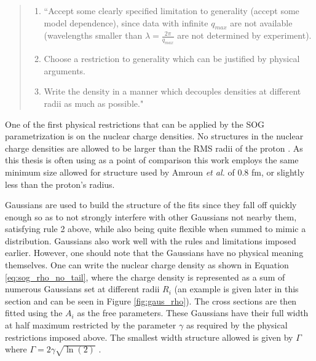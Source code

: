 \begin{quote}
	\begin{enumerate}
		\item ``Accept some clearly specified limitation to generality (accept some model dependence), since data with infinite $q_{max}$ are not available (wavelengths smaller than $\lambda = \frac{2\pi}{q_{max}}$ are not determined by experiment).
		\item Choose a restriction to generality which can be justified by physical arguments.
		\item Write the density in a manner which decouples densities at different radii as much as possible." \cite{Article:SOG}
	\end{enumerate}
\end{quote} 

One of the first physical restrictions that can be applied by the SOG parametrization is on the nuclear charge densities. No structures in the nuclear charge densities are allowed to be larger than the RMS radii of the proton \cite{Article:SOG}. As this thesis is often using \cite{Article:Amroun} as a point of comparison this work employs the same minimum size allowed for structure used by Amroun \textit{et al.} \cite{Article:Amroun} of 0.8 fm, or slightly less than the proton's radius. 


Gaussians are used to build the structure of the fits since they fall off quickly enough so as to not strongly interfere with other Gaussians not nearby them, satisfying rule 2 above, while also being quite flexible when summed to mimic a distribution. Gaussians also work well with the rules and limitations imposed earlier. However, one should note that the Gaussians have no physical meaning themselves. One can write the nuclear charge density as shown in Equation \ref{eq:sog_rho_no_tail}, where the charge density is represented as a sum of numerous Gaussians set at different radii $R_i$ (an example is given later in this section and can be seen in Figure \ref{fig:gaus_rho}). The cross sections are then fitted using the $A_i$ as the free parameters. These Gaussians have their full width at half maximum restricted by the parameter $\gamma$ as required by the physical restrictions imposed above. The smallest width structure allowed is given by $\Gamma$ where $\Gamma = 2\gamma \sqrt{\ln(2)}$ \cite{Article:SOG}. %

